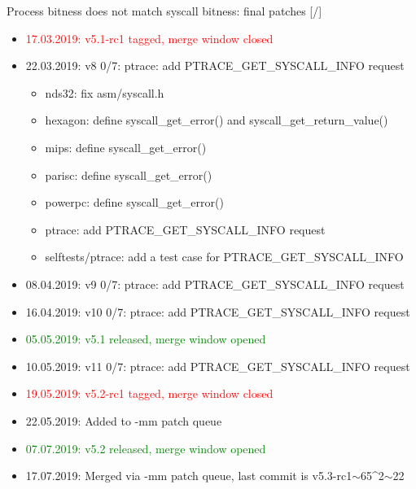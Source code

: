 \documentclass[unicode,aspectratio=169]{beamer}
\begin{document}
\begin{frame}{Process bitness does not match syscall bitness: final patches \hfill [\insertframenumber/\inserttotalframenumber]}
\begin{itemize}
	\item \textcolor{red}{17.03.2019: v5.1-rc1 tagged, merge window closed}
	\item 22.03.2019: v8 0/7: ptrace: add PTRACE\_GET\_SYSCALL\_INFO request
	\begin{itemize}
		\item nds32: fix asm/syscall.h
		\item hexagon: define syscall\_get\_error() and syscall\_get\_return\_value()
		\item mips: define syscall\_get\_error()
		\item parisc: define syscall\_get\_error()
		\item powerpc: define syscall\_get\_error()
		\item ptrace: add PTRACE\_GET\_SYSCALL\_INFO request
		\item selftests/ptrace: add a test case for PTRACE\_GET\_SYSCALL\_INFO
	\end{itemize}
	\item 08.04.2019: v9 0/7: ptrace: add PTRACE\_GET\_SYSCALL\_INFO request
	\item 16.04.2019: v10 0/7: ptrace: add PTRACE\_GET\_SYSCALL\_INFO request
	\item \textcolor{green}{05.05.2019: v5.1 released, merge window opened}
	\item 10.05.2019: v11 0/7: ptrace: add PTRACE\_GET\_SYSCALL\_INFO request
	\item \textcolor{red}{19.05.2019: v5.2-rc1 tagged, merge window closed}
	\item 22.05.2019: Added to -mm patch queue
	\item \textcolor{green}{07.07.2019: v5.2 released, merge window opened}
	\item 17.07.2019: Merged via -mm patch queue, last commit is v5.3-rc1$\sim$65{\textasciicircum}2$\sim$22
\end{itemize}
\end{frame}
\end{document}
